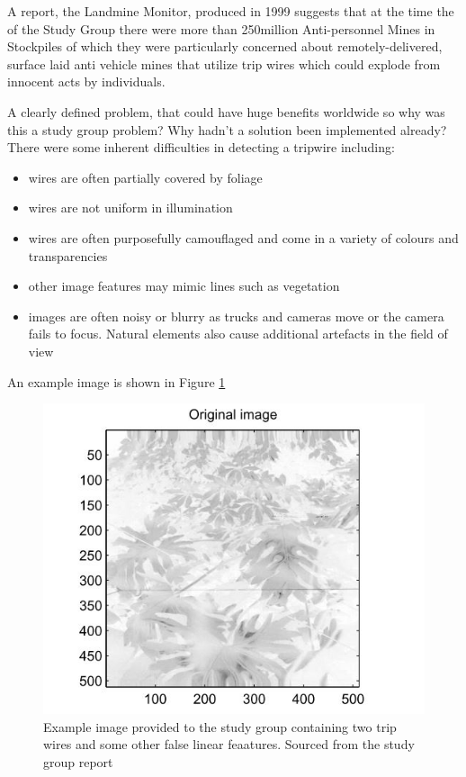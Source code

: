 \documentclass[11pt]{article} %
\begin{document}
	A report, the Landmine Monitor, produced in 1999 \cite{landmine} suggests that at the time the of the Study Group there were more than 250million Anti-personnel Mines in Stockpiles of which they were particularly concerned about remotely-delivered, surface laid anti vehicle mines that utilize trip wires which could explode from innocent acts by individuals. 
	
	A clearly defined  problem, that could have huge benefits worldwide so why was this a study group problem? Why hadn't a solution been implemented already? There were some inherent difficulties in detecting a tripwire including:
	\begin{itemize}
	\item wires are often partially covered by foliage
	\item wires are not uniform in illumination 
	\item wires are often purposefully camouflaged and come in a variety of colours and transparencies
	\item other image features may mimic lines such as vegetation 
	\item images are often noisy or blurry as trucks and cameras move or the camera fails to focus. Natural elements also cause additional artefacts in the field of view
	\end{itemize}
	An example image is shown in Figure \ref{fig:landmine-image}
	
	\begin{figure}
		\centering
		\includegraphics[width=0.7\linewidth]{"Report_images/landmine image"}
		\caption{Example image provided to the study group containing two trip wires and some other false linear feaatures. Sourced from the study group report \cite{Jessop}}
		\label{fig:landmine-image}
	\end{figure}
	
\end{document}
